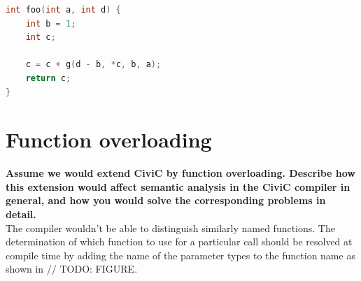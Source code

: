 \documentclass[hidelinks]{uva-inf-article}
\begin{document}
\begin{flushleft}
\begin{lstlisting}[basicstyle=\small, language=C]
int foo(int a, int d) {
	int b = 1;
	int c;

	c = c + g(d - b, *c, b, a);
	return c;
}
\end{lstlisting}
\newpage
\section{Function overloading}
\textbf{Assume we would extend CiviC by function overloading. Describe how 
this extension would affect semantic analysis in the CiviC compiler in general, 
and how you would solve the corresponding problems in detail.\\}
The compiler wouldn't be able to distinguish similarly named functions.
The determination of which function to use for a particular call should 
be resolved at compile time by adding the name of the parameter types to the function name as shown in // TODO: FIGURE.

\end{flushleft}
\end{document}
